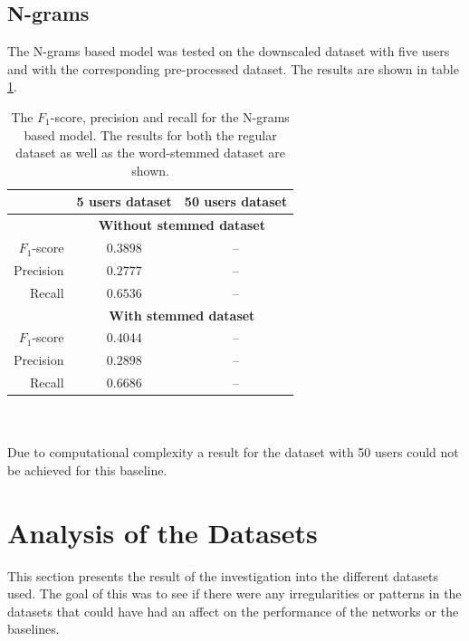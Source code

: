\subsection{N-grams}
The N-grams based model was tested on the downscaled dataset with five users and with the corresponding pre-processed dataset. The results are shown in table \ref{table:ngram_results}.
\begin{table}[h!]
    \centering
    \begin{tabular}{ r | c | c }
     & \textbf{5 users dataset} & \textbf{50 users dataset} \\ \hline \hline
     & \multicolumn{2}{c}{\textbf{Without stemmed dataset}} \\ \hline \hline
    $F_1$-score & $0.3898$ & -- \\ \hline
    Precision & $0.2777$ & -- \\ \hline
    Recall & $0.6536$ & -- \\ \hline \hline
    & \multicolumn{2}{c}{\textbf{With stemmed dataset}} \\ \hline \hline
    $F_1$-score & $0.4044$ & -- \\ \hline
    Precision & $0.2898$ & -- \\ \hline
    Recall & $0.6686$ & -- \\ \hline
    \end{tabular}
    \caption{The $F_1$-score, precision and recall for the N-grams based model. The results for both the regular dataset as well as the word-stemmed dataset are shown.}
    \label{table:ngram_results}
\end{table}
\\\\
Due to computational complexity a result for the dataset with 50 users could not be achieved for this baseline.

\section{Analysis of the Datasets}
\label{sec:dataset-summary}
This section presents the result of the investigation into the different datasets used. The goal of this was to see if there were any irregularities or patterns in the datasets that could have had an affect on the performance of the networks or the baselines.

